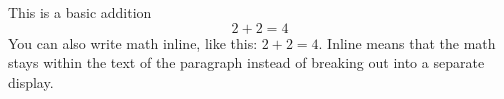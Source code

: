 



This is a basic addition
$$
2 + 2 = 4
$$
You can also write math inline, like this: $2 + 2 = 4$. Inline means that the
math stays within the text of the paragraph instead of breaking out into a
separate display.

\bye

